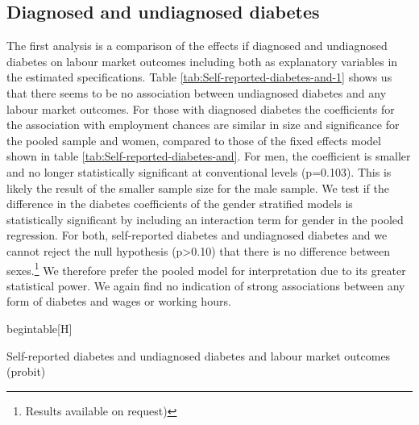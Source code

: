 \subsection{Diagnosed and undiagnosed diabetes}

The first analysis is a comparison of the effects if diagnosed and
undiagnosed diabetes on labour market outcomes including both as explanatory
variables in the estimated specifications. Table \ref{tab:Self-reported-diabetes-and-1}
shows us that there seems to be no association between undiagnosed
diabetes and any labour market outcomes. For those with diagnosed
diabetes the coefficients for the association with employment chances
are similar in size and significance for the pooled sample and women,
compared to those of the fixed effects model shown in table \ref{tab:Self-reported-diabetes-and}.
For men, the coefficient is smaller and no longer statistically significant
at conventional levels (p=0.103). This is likely the result of the
smaller sample size for the male sample. We test if the difference
in the diabetes coefficients of the gender stratified models is statistically
significant by including an interaction term for gender in the pooled
regression. For both, self-reported diabetes and undiagnosed diabetes
and we cannot reject the null hypothesis (p>0.10) that there is no
difference between sexes.\footnote{Results available on request)}
We therefore prefer the pooled model for interpretation due to its
greater statistical power. We again find no indication of strong associations
between any form of diabetes and wages or working hours. 

begin{table}[H]
\caption{\label{tab:Self-reported-diabetes-and-1}Self-reported diabetes and
undiagnosed diabetes and labour market outcomes (probit)}


